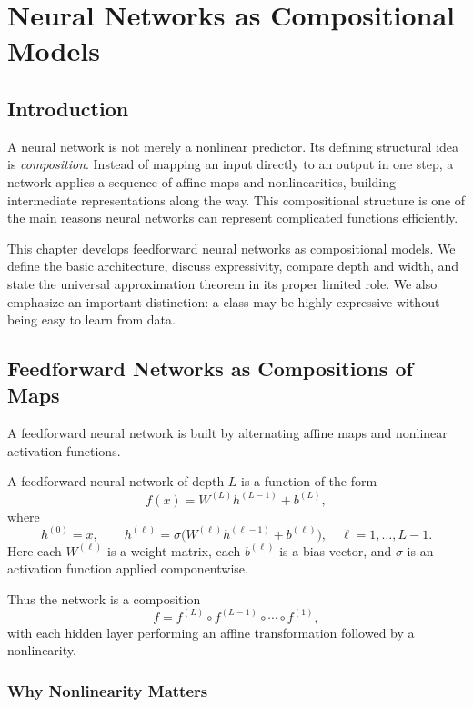\chapter{Neural Networks as Compositional Models}

\section{Introduction}

A neural network is not merely a nonlinear predictor. Its defining structural idea is \emph{composition}. Instead of mapping an input directly to an output in one step, a network applies a sequence of affine maps and nonlinearities, building intermediate representations along the way. This compositional structure is one of the main reasons neural networks can represent complicated functions efficiently.

This chapter develops feedforward neural networks as compositional models. We define the basic architecture, discuss expressivity, compare depth and width, and state the universal approximation theorem in its proper limited role. We also emphasize an important distinction: a class may be highly expressive without being easy to learn from data.

\section{Feedforward Networks as Compositions of Maps}

A feedforward neural network is built by alternating affine maps and nonlinear activation functions.

\begin{definition}
A feedforward neural network of depth $L$ is a function of the form
\[
f(x)=W^{(L)}h^{(L-1)}+b^{(L)},
\]
where
\[
h^{(0)}=x,
\qquad
h^{(\ell)}=\sigma\!\big(W^{(\ell)}h^{(\ell-1)}+b^{(\ell)}\big),
\quad \ell=1,\dots,L-1.
\]
Here each $W^{(\ell)}$ is a weight matrix, each $b^{(\ell)}$ is a bias vector, and $\sigma$ is an activation function applied componentwise.
\end{definition}

Thus the network is a composition
\[
f = f^{(L)} \circ f^{(L-1)} \circ \cdots \circ f^{(1)},
\]
with each hidden layer performing an affine transformation followed by a nonlinearity.

\subsection{Why Nonlinearity Matters}

